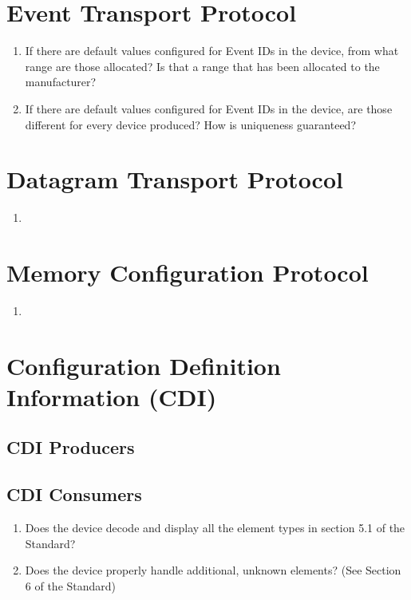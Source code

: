 \section{Event Transport Protocol}
\begin{enumerate}
    \item If there are default values configured for Event IDs in the device,
        from what range are those allocated? Is that a range that has been
        allocated to the manufacturer?
    \item  If there are default values configured for Event IDs in the device,
        are those different for every device produced? How is uniqueness
        guaranteed?
\end{enumerate}

\section{Datagram Transport Protocol}
\begin{enumerate}
    \item 
\end{enumerate}

\section{Memory Configuration Protocol}
\begin{enumerate}
    \item 
\end{enumerate}

\section{Configuration Definition Information (CDI)}
\subsection{CDI Producers}

\subsection{CDI Consumers}
\begin{enumerate}
    \item Does the device decode and display all the element types in section 
            5.1 of the Standard?
    \item Does the device properly handle additional, unknown elements? 
            (See Section 6 of the Standard)
\end{enumerate}

